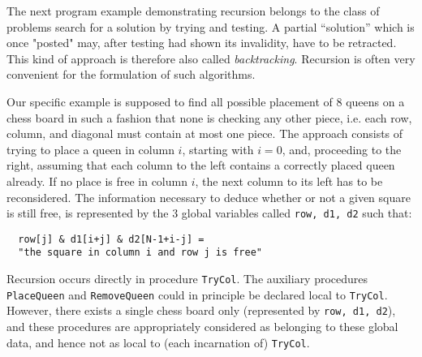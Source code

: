 The next program example demonstrating recursion belongs to the class of problems search
for a solution by trying and testing. A partial “solution” which is once "posted" may,
after testing had shown its invalidity, have to be retracted. This kind of approach is
therefore also called \emph{backtracking}. Recursion is often very convenient for the
formulation of such algorithms.

Our specific example is supposed to find all possible placement of 8 queens on a chess
board in such a fashion that none is checking any other piece, i.e. each row, column, and
diagonal must contain at most one piece. The approach consists of trying to place a queen
in column $i$, starting with $i = 0$, and, proceeding to the right, assuming that each
column to the left contains a correctly placed queen already. If no place is free in column
$i$, the next column to its left has to be reconsidered. The information necessary to
deduce whether or not a given square is still free, is represented by the 3 global variables
called \verb|row, d1, d2| such that:
\begin{verbatim}
  row[j] & d1[i+j] & d2[N-1+i-j] =
  "the square in column i and row j is free"
\end{verbatim}
Recursion occurs directly in procedure \verb|TryCol|. The auxiliary procedures \verb|PlaceQueen|
and \verb|RemoveQueen| could in principle be declared local to \verb|TryCol|. However, there
exists a single chess board only (represented by \verb|row, d1, d2|), and these procedures
are appropriately considered as belonging to these global data, and hence not as local to
(each incarnation of) \verb|TryCol|.
